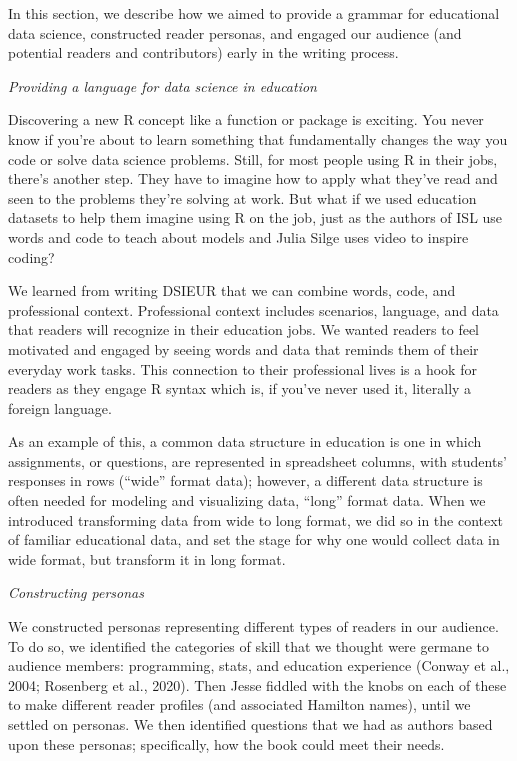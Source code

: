 \documentclass[
  english,
  man]{apa6}
\begin{document}
In this section, we describe how we aimed to provide a grammar for educational data science, constructed reader personas, and engaged our audience (and potential readers and contributors) early in the writing process.

\emph{Providing a language for data science in education}

Discovering a new R concept like a function or package is exciting. You never know if you're about to learn something that fundamentally changes the way you code or solve data science problems. Still, for most people using R in their jobs, there's another step. They have to imagine how to apply what they've read and seen to the problems they're solving at work. But what if we used education datasets to help them imagine using R on the job, just as the authors of ISL use words and code to teach about models and Julia Silge uses video to inspire coding?

We learned from writing DSIEUR that we can combine words, code, and professional context. Professional context includes scenarios, language, and data that readers will recognize in their education jobs. We wanted readers to feel motivated and engaged by seeing words and data that reminds them of their everyday work tasks. This connection to their professional lives is a hook for readers as they engage R syntax which is, if you've never used it, literally a foreign language.

As an example of this, a common data structure in education is one in which assignments, or questions, are represented in spreadsheet columns, with students' responses in rows (``wide'' format data); however, a different data structure is often needed for modeling and visualizing data, ``long'' format data. When we introduced transforming data from wide to long format, we did so in the context of familiar educational data, and set the stage for why one would collect data in wide format, but transform it in long format.

\emph{Constructing personas}

We constructed personas representing different types of readers in our audience. To do so, we identified the categories of skill that we thought were germane to audience members: programming, stats, and education experience (Conway et al., 2004; Rosenberg et al., 2020). Then Jesse fiddled with the knobs on each of these to make different reader profiles (and associated Hamilton names), until we settled on personas. We then identified questions that we had as authors based upon these personas; specifically, how the book could meet their needs.
\end{document}
